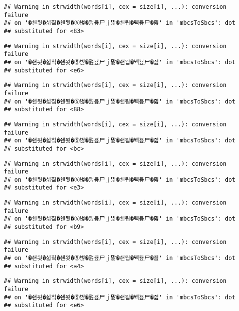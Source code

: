 \documentclass[]{article}
\begin{document}
\begin{verbatim}
## Warning in strwidth(words[i], cex = size[i], ...): conversion failure
## on '�쇈묏�싧칰�쇈묏�⑤벊�앮뵾尸ｊ맒�쇈묍�붹뵾尸�즲' in 'mbcsToSbcs': dot
## substituted for <83>
\end{verbatim}

\begin{verbatim}
## Warning in strwidth(words[i], cex = size[i], ...): conversion failure
## on '�쇈묏�싧칰�쇈묏�⑤벊�앮뵾尸ｊ맒�쇈묍�붹뵾尸�즲' in 'mbcsToSbcs': dot
## substituted for <e6>
\end{verbatim}

\begin{verbatim}
## Warning in strwidth(words[i], cex = size[i], ...): conversion failure
## on '�쇈묏�싧칰�쇈묏�⑤벊�앮뵾尸ｊ맒�쇈묍�붹뵾尸�즲' in 'mbcsToSbcs': dot
## substituted for <88>
\end{verbatim}

\begin{verbatim}
## Warning in strwidth(words[i], cex = size[i], ...): conversion failure
## on '�쇈묏�싧칰�쇈묏�⑤벊�앮뵾尸ｊ맒�쇈묍�붹뵾尸�즲' in 'mbcsToSbcs': dot
## substituted for <bc>
\end{verbatim}

\begin{verbatim}
## Warning in strwidth(words[i], cex = size[i], ...): conversion failure
## on '�쇈묏�싧칰�쇈묏�⑤벊�앮뵾尸ｊ맒�쇈묍�붹뵾尸�즲' in 'mbcsToSbcs': dot
## substituted for <e3>
\end{verbatim}

\begin{verbatim}
## Warning in strwidth(words[i], cex = size[i], ...): conversion failure
## on '�쇈묏�싧칰�쇈묏�⑤벊�앮뵾尸ｊ맒�쇈묍�붹뵾尸�즲' in 'mbcsToSbcs': dot
## substituted for <b9>
\end{verbatim}

\begin{verbatim}
## Warning in strwidth(words[i], cex = size[i], ...): conversion failure
## on '�쇈묏�싧칰�쇈묏�⑤벊�앮뵾尸ｊ맒�쇈묍�붹뵾尸�즲' in 'mbcsToSbcs': dot
## substituted for <a4>
\end{verbatim}

\begin{verbatim}
## Warning in strwidth(words[i], cex = size[i], ...): conversion failure
## on '�쇈묏�싧칰�쇈묏�⑤벊�앮뵾尸ｊ맒�쇈묍�붹뵾尸�즲' in 'mbcsToSbcs': dot
## substituted for <e6>
\end{verbatim}
\end{document}
